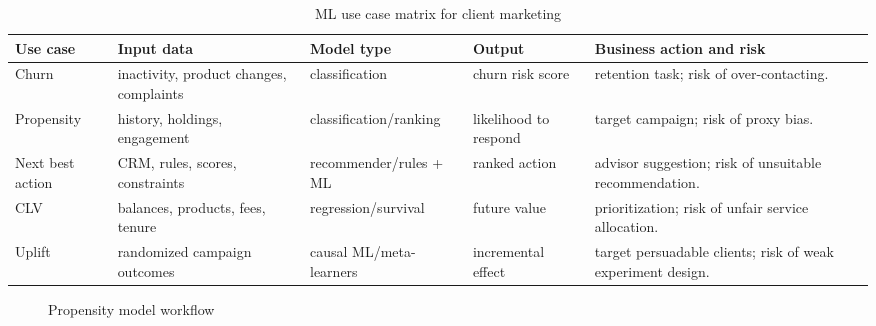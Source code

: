 \documentclass[
	11pt,
	fleqn,
	a4paper,
	oneside,
]{LegrandOrangeBook}
\begin{document}
\begin{table}[H]
	\centering
	\footnotesize
	\begin{tabularx}{\textwidth}{L{0.15\textwidth} L{0.20\textwidth} L{0.16\textwidth} L{0.16\textwidth} Y}
		\toprule
		\textbf{Use case} & \textbf{Input data} & \textbf{Model type} & \textbf{Output} & \textbf{Business action and risk}\\
		\midrule
		Churn & inactivity, product changes, complaints & classification & churn risk score & retention task; risk of over-contacting.\\
		Propensity & history, holdings, engagement & classification/ranking & likelihood to respond & target campaign; risk of proxy bias.\\
		Next best action & CRM, rules, scores, constraints & recommender/rules + ML & ranked action & advisor suggestion; risk of unsuitable recommendation.\\
		CLV & balances, products, fees, tenure & regression/survival & future value & prioritization; risk of unfair service allocation.\\
		Uplift & randomized campaign outcomes & causal ML/meta-learners & incremental effect & target persuadable clients; risk of weak experiment design.\\
		\bottomrule
	\end{tabularx}
	\caption{ML use case matrix for client marketing}
\end{table}

\begin{figure}[H]
	\centering
	\caption{Propensity model workflow}
\end{figure}
\end{document}

